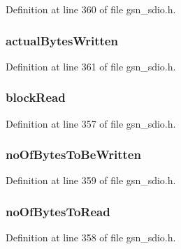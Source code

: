 Definition at line 360 of file gsn\_\-sdio.h.

\hypertarget{a00216_acaadb3f45d67507c5f8f58ab6df0a970}{
\subsubsection[{actualBytesWritten}]{ {\bf actualBytesWritten}}}
\label{a00216_acaadb3f45d67507c5f8f58ab6df0a970}


Definition at line 361 of file gsn\_\-sdio.h.

\hypertarget{a00216_ae1125ef709bd2329399f5350bc6968de}{
\subsubsection[{blockRead}]{ {\bf blockRead}}}
\label{a00216_ae1125ef709bd2329399f5350bc6968de}


Definition at line 357 of file gsn\_\-sdio.h.

\hypertarget{a00216_ae09323dd91f7fb30eeaa3d7e3ec1c2a8}{
\subsubsection[{noOfBytesToBeWritten}]{ {\bf noOfBytesToBeWritten}}}
\label{a00216_ae09323dd91f7fb30eeaa3d7e3ec1c2a8}


Definition at line 359 of file gsn\_\-sdio.h.

\hypertarget{a00216_a96ecaff82c1cc0fe60c48e5eb2b2e471}{
\subsubsection[{noOfBytesToRead}]{ {\bf noOfBytesToRead}}}
\label{a00216_a96ecaff82c1cc0fe60c48e5eb2b2e471}


Definition at line 358 of file gsn\_\-sdio.h.

